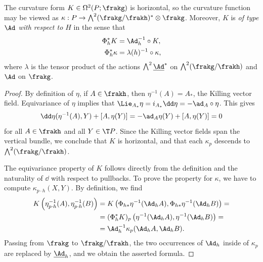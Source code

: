 \begin{lem}\label{lem 1.5.1 Cap}
    The curvature form $K\in\Omega^2(P;\frakg)$ is horizontal, so the curvature function may be viewed as $\kappa:P\to \bigwedge^2(\frakg\slash\frakh)^\ast\otimes\frakg$. Moreover, $K$ is \emph{of type $\Ad$ with respect to $H$} in the sense that 
    \begin{align}
        \Phi_h^\ast K&=\Ad_h^{-1}\circ K,\\
        \Phi_h^\ast\kappa&=\lambda(h)^{-1}\circ\kappa,
    \end{align}
    where $\lambda$ is the tensor product of the actions $\bigwedge^2 \underline{\Ad}^\ast$ on $\bigwedge^2(\frakg\slash\frakh)$ and $\Ad$ on $\frakg$.
\end{lem}
\begin{proof}
    By definition of $\eta$, if $A\in\frakh$, then $\eta^{-1}(A)=A_\ast$, the Killing vector field. Equivariance of $\eta$ implies that $\Lie_{A_\ast}\eta=i_{A_\ast}\dd\eta=-\ad_A\circ\eta$. This gives 
    \[\dd\eta(\eta^{-1}(A),Y)+[A,\eta(Y)]=-\ad_{A}\eta(Y)+[A,\eta(Y)]=0\]
    for all $A\in\frakh$ and all $Y\in \T P$. Since the Killing vector fields span the vertical bundle, we conclude that $K$ is horizontal, and that each $\kappa_p$ descends to $\bigwedge^2(\frakg\slash\frakh)$.
    
    The equivariance property of $K$ follows directly from the definition and the naturality of $\dd$ with respect to pullbacks. To prove the property for $\kappa$, we have to compute $\kappa_{p\cdot h}(X,Y)$. By definition, we find 
    \begin{align}
        K\left(\eta_{p\cdot h}^{-1}(A),\eta_{p\cdot h}^{-1}(B)\right)&=K\left(\Phi_{h\ast}\eta^{-1}(\Ad_h A),\Phi_{h\ast}\eta^{-1}(\Ad_h B)\right)=\\
        &=(\Phi_h^\ast K)_p \left(\eta^{-1}(\Ad_h A),\eta^{-1}(\Ad_h B)\right)=\\
        &=\Ad_h^{-1}\kappa_p(\Ad_h A,\Ad_h B).
    \end{align}
    Passing from $\frakg$ to $\frakg\slash\frakh$, the two occurrences of $\Ad_h$ inside of $\kappa_p$ are replaced by $\underline{\Ad}_h$, and we obtain the asserted formula.
\end{proof}



